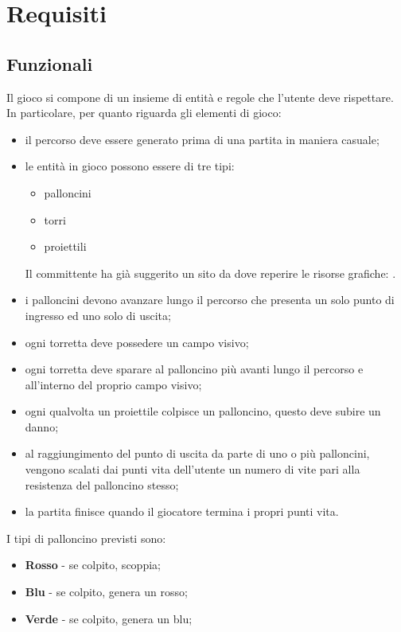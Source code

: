 \section{Requisiti}

\subsection{Funzionali}
Il gioco si compone di un insieme di entità e regole che l'utente deve rispettare. In particolare, per quanto riguarda gli elementi di gioco:
\begin{itemize}
    \item il percorso deve essere generato prima di una partita in maniera casuale;
    \item le entità in gioco possono essere di tre tipi:
    \begin{itemize}
        \item palloncini
        \item torri
        \item proiettili
    \end{itemize}
    Il committente ha già suggerito un sito da dove reperire le risorse grafiche: \cite{BaloonsTD5}.
    \item i palloncini devono avanzare lungo il percorso che presenta un solo punto di ingresso ed uno solo di uscita;
    \item ogni torretta deve possedere un campo visivo;
    \item ogni torretta deve sparare al palloncino più avanti lungo il percorso e all'interno del proprio campo visivo;
    \item ogni qualvolta un proiettile colpisce un palloncino, questo deve subire un danno;
    \item al raggiungimento del punto di uscita da parte di uno o più palloncini, vengono scalati dai punti vita dell'utente un numero di vite pari alla resistenza del palloncino stesso;
    \item la partita finisce quando il giocatore termina i propri punti vita.
\end{itemize}
I tipi di palloncino previsti sono:
\begin{itemize}
    \item \textbf{Rosso} - se colpito, scoppia;
    \item \textbf{Blu} - se colpito, genera un rosso;
    \item \textbf{Verde} - se colpito, genera un blu;
\end{itemize}
